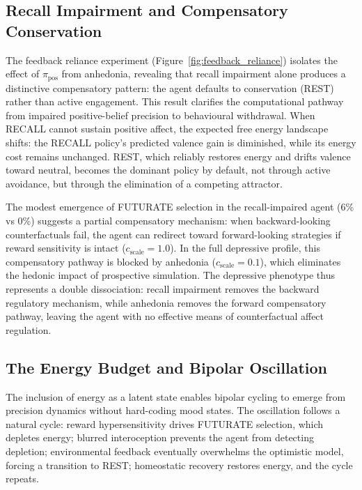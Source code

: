 \documentclass[11pt,a4paper]{article}
\begin{document}
\subsection{Recall Impairment and Compensatory Conservation}

The feedback reliance experiment (Figure~\ref{fig:feedback_reliance}) isolates the effect of $\pi_{\text{pos}}$ from anhedonia, revealing that recall impairment alone produces a distinctive compensatory pattern: the agent defaults to conservation (REST) rather than active engagement. This result clarifies the computational pathway from impaired positive-belief precision to behavioural withdrawal. When RECALL cannot sustain positive affect, the expected free energy landscape shifts: the RECALL policy's predicted valence gain is diminished, while its energy cost remains unchanged. REST, which reliably restores energy and drifts valence toward neutral, becomes the dominant policy by default, not through active avoidance, but through the elimination of a competing attractor.

The modest emergence of FUTURATE selection in the recall-impaired agent (6\% vs 0\%) suggests a partial compensatory mechanism: when backward-looking counterfactuals fail, the agent can redirect toward forward-looking strategies if reward sensitivity is intact ($c_{\text{scale}} = 1.0$). In the full depressive profile, this compensatory pathway is blocked by anhedonia ($c_{\text{scale}} = 0.1$), which eliminates the hedonic impact of prospective simulation. The depressive phenotype thus represents a double dissociation: recall impairment removes the backward regulatory mechanism, while anhedonia removes the forward compensatory pathway, leaving the agent with no effective means of counterfactual affect regulation.

\subsection{The Energy Budget and Bipolar Oscillation}

The inclusion of energy as a latent state enables bipolar cycling to emerge from precision dynamics without hard-coding mood states. The oscillation follows a natural cycle: reward hypersensitivity drives FUTURATE selection, which depletes energy; blurred interoception prevents the agent from detecting depletion; environmental feedback eventually overwhelms the optimistic model, forcing a transition to REST; homeostatic recovery restores energy, and the cycle repeats.
\end{document}
